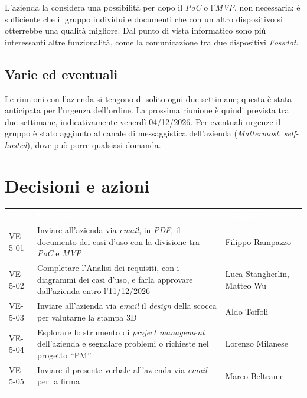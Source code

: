 \documentclass[12pt,a4paper]{article}
\begin{document}
L'azienda la considera una possibilità per dopo il \emph{PoC} o l'\emph{MVP}, non necessaria: è sufficiente che il gruppo individui e documenti che con un altro dispositivo si otterrebbe una qualità migliore. Dal punto di vista informatico sono più interessanti altre funzionalità, come la comunicazione tra due dispositivi \emph{Fossdot}.

\subsection{Varie ed eventuali}

Le riunioni con l'azienda si tengono di solito ogni due settimane; questa è stata anticipata per l'urgenza dell'ordine. La prossima riunione è quindi prevista tra due settimane, indicativamente venerdì 04/12/2026. Per eventuali urgenze il gruppo è stato aggiunto al canale di messaggistica dell'azienda (\emph{Mattermost}, \emph{self-hosted}), dove può porre qualsiasi domanda.

\section{Decisioni e azioni}

\begin{center}
\begin{tabularx}{\linewidth}{>{\hsize=0.511\hsize\raggedright\arraybackslash}X>{\hsize=1.675\hsize\raggedright\arraybackslash}X>{\hsize=0.814\hsize\raggedright\arraybackslash}X}
\rowcolor{bfblue}\textcolor{white}{\textbf{ID}} & \textcolor{white}{\textbf{Descrizione}} & \textcolor{white}{\textbf{Assegnatario}} \\
VE-5-01 & Inviare all'azienda via \emph{email}, in \emph{PDF}, il documento dei casi d'uso con la divisione tra \emph{PoC} e \emph{MVP} & Filippo Rampazzo \\ \arrayrulecolor{bfline}\hline
VE-5-02 & Completare l'Analisi dei requisiti, con i diagrammi dei casi d'uso, e farla approvare dall'azienda entro l'11/12/2026 & Luca Stangherlin, Matteo Wu \\ \arrayrulecolor{bfline}\hline
VE-5-03 & Inviare all'azienda via \emph{email} il \emph{design} della scocca per valutarne la stampa 3D & Aldo Toffoli \\ \arrayrulecolor{bfline}\hline
VE-5-04 & Esplorare lo strumento di \emph{project management} dell'azienda e segnalare problemi o richieste nel progetto ``PM'' & Lorenzo Milanese \\ \arrayrulecolor{bfline}\hline
VE-5-05 & Inviare il presente verbale all'azienda via \emph{email} per la firma & Marco Beltrame \\ \arrayrulecolor{bfline}\hline
\end{tabularx}
\end{center}
\end{document}
